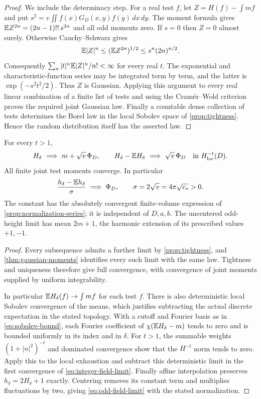 \begin{proof}
We include the determinacy step. For a real test $f$, let
$Z=H(f)-\int mf$ and put
$s^2=v\iint f(x)G_D(x,y)f(y)\,dx\,dy$. The moment formula gives
$\mathbb E Z^{2n}=(2n-1)!!\,s^{2n}$ and all odd moments zero. If
$s=0$ then $Z=0$ almost surely. Otherwise Cauchy--Schwarz gives
\[
 \mathbb E|Z|^n\le (\mathbb E Z^{2n})^{1/2}
                  \le s^n(2n)^{n/2}.
\]
Consequently $\sum_n |t|^n\mathbb E|Z|^n/n!<\infty$ for every real
$t$. The exponential and characteristic-function series may be
integrated term by term, and the latter is
$\exp(-s^2t^2/2)$. Thus $Z$ is Gaussian. Applying this argument
to every real linear combination of a finite list of tests and
using the Cram\'er--Wold criterion proves the required joint
Gaussian law. Finally a countable dense collection of tests
determines the Borel law in the local Sobolev space of
\cref{prop:tightness}. Hence the random distribution itself has
the asserted law.
\end{proof}

\begin{corollary}
\label{cor:field-limit}
For every $t>1$,
\begin{equation}
 H_\delta\ \Longrightarrow\ m+\sqrt v\,\Phi_D,
 \qquad
 H_\delta-\mathbb E H_\delta\ \Longrightarrow\ \sqrt v\,\Phi_D
 \quad\text{in }H^{-t}_{\mathrm{loc}}(D).
 \label{eq:integer-field-limit}
\end{equation}
All finite joint test moments converge. In particular
\begin{equation}
 \frac{h_\delta-\mathbb E h_\delta}{\sigma}
       \ \Longrightarrow\ \Phi_D,
 \qquad
            \sigma=2\sqrt v=4\pi\sqrt{c_*}>0.
 \label{eq:odd-field-limit}
\end{equation}
The constant has the absolutely convergent finite-volume expression
of \cref{prop:normalization-series}; it is independent of $D,a,b$.
The uncentered odd-height limit has mean $2m+1$, the harmonic
extension of its prescribed values $+1,-1$.
\end{corollary}

\begin{proof}
Every subsequence admits a further limit by \cref{prop:tightness},
and \cref{thm:gaussian-moments} identifies every such limit with
the same law. Tightness and uniqueness therefore give full
convergence, with convergence of joint moments supplied by
uniform integrability.

In particular $\mathbb E H_\delta(f)\to\int mf$ for each test $f$.
There is also deterministic local Sobolev convergence of the
means, which justifies subtracting the actual discrete expectation
in the stated topology. With a cutoff and Fourier basis as in
\eqref{eq:sobolev-bound}, each Fourier coefficient of
$\chi(\mathbb E H_\delta-m)$ tends to zero and is bounded uniformly
in its index and in $\delta$. For $t>1$, the summable weights
$(1+|n|^2)^{-t}$ and dominated convergence show that the
$H^{-t}$ norm tends to zero. Apply this to the local exhaustion
and subtract this deterministic limit in the first convergence
of \eqref{eq:integer-field-limit}. Finally affine interpolation
preserves $h_\delta=2H_\delta+1$ exactly. Centering removes its
constant term and multiplies fluctuations by two, giving
\eqref{eq:odd-field-limit} with the stated normalization.
\end{proof}
